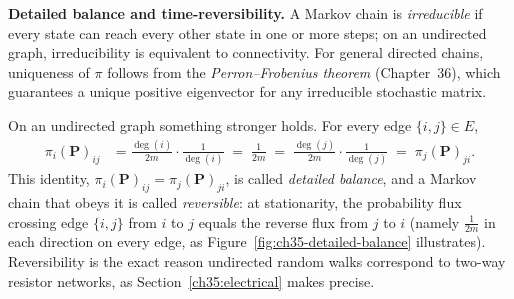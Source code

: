 \begin{intuitionbox}
\textbf{Detailed balance and time-reversibility.}
A Markov chain is \emph{irreducible} if every state can reach every other state in one or more steps; on an undirected graph, irreducibility is equivalent to connectivity. For general directed chains, uniqueness of $\pi$ follows from the \emph{Perron--Frobenius theorem} (Chapter~36), which guarantees a unique positive eigenvector for any irreducible stochastic matrix.

On an undirected graph something stronger holds. For every edge $\{i,j\}\in E$,
\begin{align*}
  \pi_i (\mathbf{P})_{ij} &= \frac{\deg(i)}{2m} \cdot \frac{1}{\deg(i)} \;=\; \frac{1}{2m}
  \;=\; \frac{\deg(j)}{2m} \cdot \frac{1}{\deg(j)} \;=\; \pi_j (\mathbf{P})_{ji}.
\end{align*}
This identity, $\pi_i (\mathbf{P})_{ij} = \pi_j (\mathbf{P})_{ji}$, is called \emph{detailed balance}, and a Markov chain that obeys it is called \emph{reversible}: at stationarity, the probability flux crossing edge $\{i,j\}$ from $i$ to $j$ equals the reverse flux from $j$ to $i$ (namely $\frac{1}{2m}$ in each direction on every edge, as Figure~\ref{fig:ch35-detailed-balance} illustrates). Reversibility is the exact reason undirected random walks correspond to two-way resistor networks, as Section~\ref{ch35:electrical} makes precise.
\end{intuitionbox}

